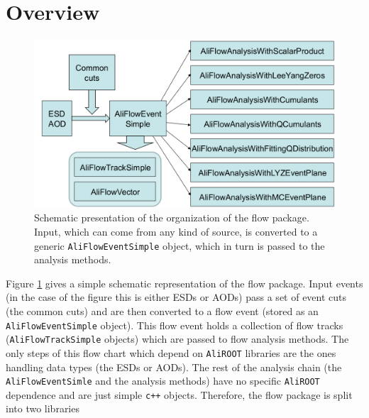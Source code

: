 \documentclass[a4paper]{book}
\numberwithin{equation}{subsection}
\begin{document}
\section{Overview}
\begin{figure}
\begin{center}
\includegraphics[width=.75\textwidth]{figs/flowChart.png}
\caption{Schematic presentation of the organization of the flow package. Input, which can come from any kind of source, is converted to a generic \texttt{AliFlowEventSimple} object, which in turn is passed to the analysis methods.}
\label{fig:flowchart}
\end{center}
\end{figure}
Figure \ref{fig:flowchart} gives a simple schematic representation of the flow package. Input events (in the case of the figure this is either ESDs or AODs) pass a set of event cuts (the common cuts) and are then converted to a flow event (stored as an \texttt{AliFlowEventSimple} object). This flow event holds a collection of flow tracks (\texttt{AliFlowTrackSimple} objects) which are passed to flow analysis methods. The only steps of this flow chart which depend on \texttt{AliROOT} libraries are the ones handling  data types (the ESDs or AODs). The rest of the analysis chain (the \texttt{AliFlowEventSimle} and the analysis methods) have no specific \texttt{AliROOT} dependence and are just simple \texttt{c++} objects. Therefore, the flow package is split into two libraries
\end{document}
